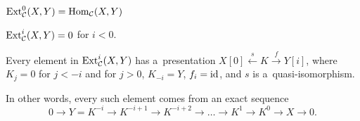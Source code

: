 	\begin{theorem}
		$\operatorname{Ext}_{\mathcal{C}}^0(X,Y) = \operatorname{Hom}_{\mathcal{C}}(X,Y)$
	\end{theorem}
	
	\begin{theorem}
		$\operatorname{Ext}_{\mathcal{C}}^i(X,Y) = 0$ for $i<0$.
	\end{theorem}
	
	\begin{theorem}
		Every element in $\operatorname{Ext}_{\mathcal{C}}^i(X,Y)$ has a~presentation 
		$X[0] \xleftarrow{s} K \xrightarrow{f} Y[i]$,
		where $K_j = 0$ for $j < -i$ and for $j > 0$,
		$K_{-i} = Y$, $f_i = {\mathrm{id}}$, and $s$ is a~quasi-isomorphism.
		
		In other words, every such element comes from
		an exact sequence
		$$0 \to Y= K^{-i} \to K^{-i+1} \to K^{-i+2} \to \ldots
		\to K^1 \to K^0 \to X \to 0.$$
	\end{theorem}













 
 
